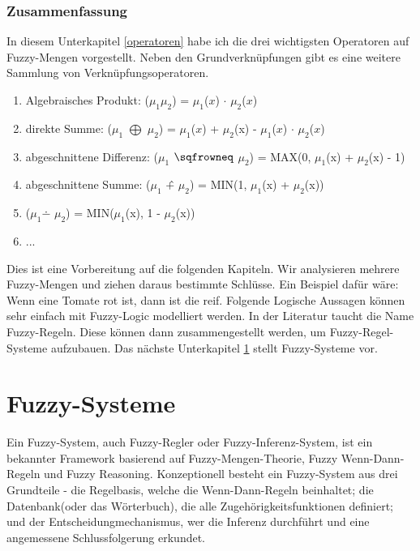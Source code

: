 \subsubsection{Zusammenfassung}

In diesem Unterkapitel \ref{operatoren} habe ich die drei wichtigsten Operatoren auf Fuzzy-Mengen vorgestellt. Neben den Grundverknüpfungen gibt es eine weitere Sammlung von Verknüpfungsoperatoren.

\begin{enumerate}
	\item Algebraisches Produkt: ($\mu_1$$\mu_2$) = $\mu_1$($x$) $\cdot$ $\mu_2$($x$)
	\item direkte Summe: ($\mu_1$ $\bigoplus$ $\mu_2$) = $\mu_1$($x$) + $\mu_2$(x) - $\mu_1$($x$) $\cdot$ $\mu_2$($x$)
	\item abgeschnittene Differenz: ($\mu_1$ $\sqfrowneq$ $\mu_2$) = MAX(0, $\mu_1$(x) + $\mu_2$(x) - 1)
	\item abgeschnittene Summe: ($\mu_1$ \^{+} $\mu_2$) = MIN(1, $\mu_1$(x) + $\mu_2$(x))
	\item ($\mu_1$$\dotminus$ $\mu_2$) = MIN($\mu_1$(x), 1 - $\mu_2$(x))
	\item ...
\end{enumerate}

Dies ist eine Vorbereitung auf die folgenden Kapiteln. Wir analysieren mehrere Fuzzy-Mengen und ziehen daraus bestimmte Schlüsse. Ein Beispiel dafür wäre: Wenn eine Tomate rot ist, dann ist die reif. Folgende Logische Aussagen können sehr einfach mit Fuzzy-Logic modelliert werden. In der Literatur taucht die Name Fuzzy-Regeln. Diese können dann zusammengestellt werden, um Fuzzy-Regel-Systeme aufzubauen. Das nächste Unterkapitel \ref{fuzzy_systeme} stellt Fuzzy-Systeme vor. 

\section{Fuzzy-Systeme}\label{fuzzy_systeme}

Ein Fuzzy-System, auch Fuzzy-Regler oder Fuzzy-Inferenz-System, ist ein bekannter Framework basierend auf Fuzzy-Mengen-Theorie, Fuzzy Wenn-Dann-Regeln und Fuzzy Reasoning. Konzeptionell besteht ein Fuzzy-System aus drei Grundteile - die Regelbasis, welche die Wenn-Dann-Regeln beinhaltet; die Datenbank(oder das Wörterbuch), die alle Zugehörigkeitsfunktionen definiert; und der Entscheidungmechanismus, wer die Inferenz durchführt und eine angemessene Schlussfolgerung erkundet.   

